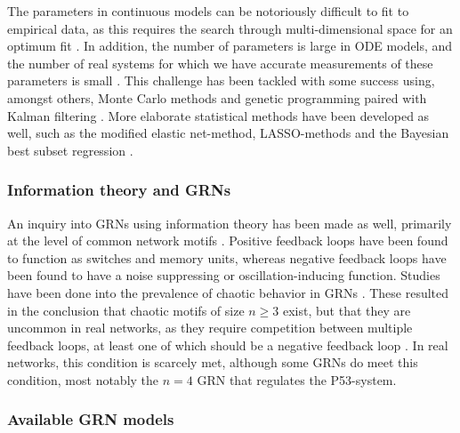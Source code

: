 \documentclass[../main.tex]{subfiles}
\begin{document}
The parameters in continuous models can be notoriously difficult to fit to empirical data, as this requires the search through multi-dimensional space for an optimum fit \cite{bolouri2002modeling, kuhn2009monte}.
In addition, the number of parameters is large in ODE models, and the number of real systems for which we have accurate measurements of these parameters is small \cite{geard2009dynamical}.
This challenge has been tackled with some success using, amongst others, Monte Carlo methods and genetic programming paired with Kalman filtering \cite{qian2008inference, kuhn2009monte}.
More elaborate statistical methods have been developed as well, such as the modified elastic net-method, LASSO-methods and the Bayesian best subset regression \cite{greenfield2013robust, wu2014sparse}.

\subsubsection{Information theory and GRNs}

An inquiry into GRNs using information theory has been made as well, primarily at the level of common network motifs \cite{zhang2012chaotic}.
Positive feedback loops have been found to function as switches and memory units, whereas negative feedback loops have been found to have a noise suppressing or oscillation-inducing function.
Studies have been done into the prevalence of chaotic behavior in GRNs \cite{zhang2012chaotic}.
These resulted in the conclusion that chaotic motifs of size $n\ge 3$ exist, but that they are uncommon in real networks, as they require competition between multiple feedback loops, at least one of which should be a negative feedback loop \cite{zhang2012chaotic}.
In real networks, this condition is scarcely met, although some GRNs do meet this condition, most notably the $n=4$ GRN that regulates the P53-system.

\subsubsection{Available GRN models}
\end{document}
